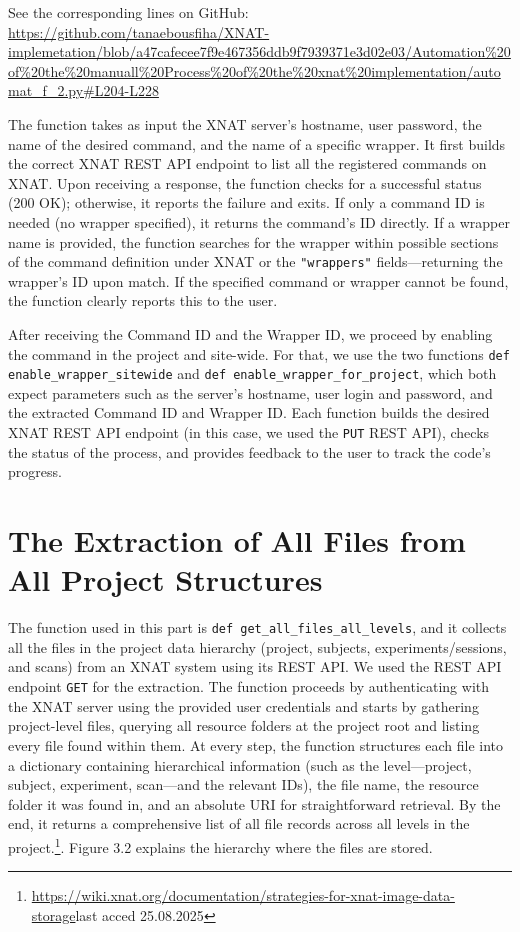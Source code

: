 \noindent\footnotesize See the corresponding lines on GitHub:\url{ https://github.com/tanaebousfiha/XNAT-implemetation/blob/a47cafecee7f9e467356ddb9f7939371e3d02e03/Automation%20of%20the%20manuall%20Process%20of%20the%20xnat%20implementation/automat_f_2.py#L204-L228}





The function takes as input the XNAT server’s hostname, user password, the name of the desired command, and the name of a specific wrapper. It first builds the correct XNAT REST API endpoint to list all the registered commands on XNAT.
Upon receiving a response, the function checks for a successful status (200 OK); otherwise, it reports the failure and exits. If only a command ID is needed (no wrapper specified), it returns the command’s ID directly. If a wrapper name is provided, the function searches for the wrapper within possible sections of the command definition under XNAT or the \texttt{"wrappers"} fields—returning the wrapper’s ID upon match. If the specified command or wrapper cannot be found, the function clearly reports this to the user.

After receiving the Command ID and the Wrapper ID, we proceed by enabling the command in the project and site-wide. For that, we use the two functions \texttt{def enable\_wrapper\_sitewide} and \texttt{def enable\_wrapper\_for\_project}, which both expect parameters such as the server’s hostname, user login and password, and the extracted Command ID and Wrapper ID. Each function builds the desired XNAT REST API endpoint (in this case, we used the \texttt{PUT} REST API), checks the status of the process, and provides feedback to the user to track the code’s progress.

\section{The Extraction of All Files from All Project Structures}

The function used in this part is \texttt{def get\_all\_files\_all\_levels}, and it collects all the files in the project data hierarchy (project, subjects, experiments/sessions, and scans) from an XNAT system using its REST API. We used the REST API endpoint \texttt{GET} for the extraction. The function proceeds by authenticating with the XNAT server using the provided user credentials and starts by gathering project-level files, querying all resource folders at the project root and listing every file found within them. At every step, the function structures each file into a dictionary containing hierarchical information (such as the level—project, subject, experiment, scan—and the relevant IDs), the file name, the resource folder it was found in, and an absolute URI for straightforward retrieval. By the end, it returns a comprehensive list of all file records across all levels in the project.\footnote{\url{ https://wiki.xnat.org/documentation/strategies-for-xnat-image-data-storage}last acced 25.08.2025}. Figure 3.2 explains the hierarchy where the files are stored.

